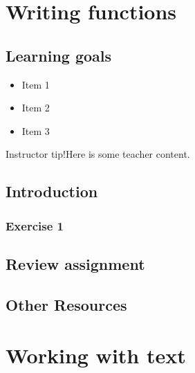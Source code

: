 \documentclass[
]{book}
\providecommand{\tightlist}{%
  \setlength{\itemsep}{0pt}\setlength{\parskip}{0pt}}
\begin{document}
\hypertarget{writing-functions}{%
\chapter{Writing functions}\label{writing-functions}}

\hypertarget{learning-goals-8}{%
\section*{Learning goals}\label{learning-goals-8}}

\begin{itemize}
\tightlist
\item
  Item 1\\
\item
  Item 2\\
\item
  Item 3
\end{itemize}

Instructor tip!Here is some teacher content.

\hypertarget{introduction-1}{%
\section*{Introduction}\label{introduction-1}}

\hypertarget{exercise-1-5}{%
\subsection*{Exercise 1}\label{exercise-1-5}}

\hypertarget{review-assignment-8}{%
\section*{Review assignment}\label{review-assignment-8}}

\hypertarget{other-resources-7}{%
\section*{Other Resources}\label{other-resources-7}}

\hypertarget{working-with-text}{%
\chapter{Working with text}\label{working-with-text}}
\end{document}

